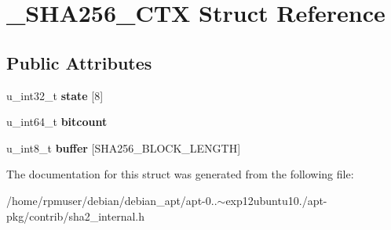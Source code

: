 \section{\-\_\-\-S\-H\-A256\-\_\-\-C\-T\-X \-Struct \-Reference}
\label{struct__SHA256__CTX}
\subsection*{\-Public \-Attributes}
\begin{DoxyCompactItemize}
\item 
u\-\_\-int32\-\_\-t {\bfseries state} [8]\label{struct__SHA256__CTX_afc95900bca1aa474d77aceec4237696c}

\item 
u\-\_\-int64\-\_\-t {\bfseries bitcount}\label{struct__SHA256__CTX_a3593cb15126345d9b952e58ecfa73101}

\item 
u\-\_\-int8\-\_\-t {\bfseries buffer} [\-S\-H\-A256\-\_\-\-B\-L\-O\-C\-K\-\_\-\-L\-E\-N\-G\-T\-H]\label{struct__SHA256__CTX_aae0e4e98cdae7ee89dd98e381db30f80}

\end{DoxyCompactItemize}


\-The documentation for this struct was generated from the following file\-:\begin{DoxyCompactItemize}
\item 
/home/rpmuser/debian/debian\-\_\-apt/apt-\/0..$\sim$exp12ubuntu10./apt-\/pkg/contrib/sha2\-\_\-internal.\-h\end{DoxyCompactItemize}
